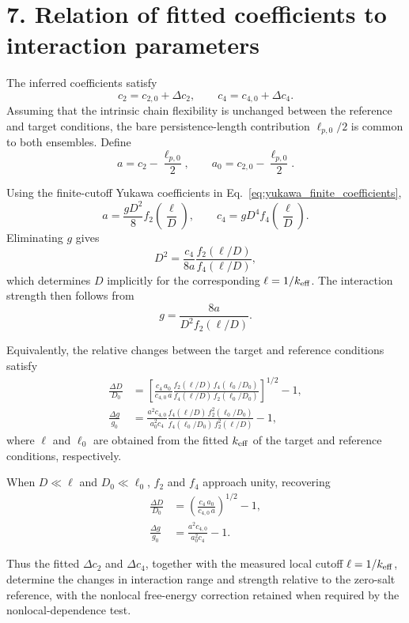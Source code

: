 \documentclass[11pt]{article}
\begin{document}
\section*{7. Relation of fitted coefficients to interaction parameters}

The inferred coefficients satisfy
\begin{equation}
c_2=c_{2,0}+\Delta c_2,
\qquad
c_4=c_{4,0}+\Delta c_4.
\end{equation}
Assuming that the intrinsic chain flexibility is unchanged between the reference and target conditions, the bare persistence-length contribution \(\ell_{p,0}/2\) is common to both ensembles. Define
\begin{equation}
a=c_2-\frac{\ell_{p,0}}{2},
\qquad
a_0=c_{2,0}-\frac{\ell_{p,0}}{2}.
\end{equation}

Using the finite-cutoff Yukawa coefficients in Eq.~\eqref{eq:yukawa_finite_coefficients},
\begin{equation}
a
=
\frac{gD^2}{8}
f_2\!\left(\frac{\ell}{D}\right),
\qquad
c_4
=
gD^4
f_4\!\left(\frac{\ell}{D}\right).
\end{equation}
Eliminating \(g\) gives
\begin{equation}
D^2
=
\frac{c_4}{8a}
\frac{
f_2\!\left(\ell/D\right)
}{
f_4\!\left(\ell/D\right)
},
\end{equation}
which determines \(D\) implicitly for the corresponding \(\ell=1/k_{\rm eff}\). The interaction strength then follows from
\begin{equation}
g
=
\frac{8a}{
D^2 f_2\!\left(\ell/D\right)
}.
\end{equation}

Equivalently, the relative changes between the target and reference conditions satisfy
\begin{align}
\frac{\Delta D}{D_0}
&=
\left[
\frac{c_4\,a_0}
{c_{4,0}\,a}
\frac{
f_2(\ell/D)\,
f_4(\ell_0/D_0)
}{
f_4(\ell/D)\,
f_2(\ell_0/D_0)
}
\right]^{1/2}
-1,
\\
\frac{\Delta g}{g_0}
&=
\frac{a^2c_{4,0}}
{a_0^2c_4}
\frac{
f_4(\ell/D)\,
f_2^2(\ell_0/D_0)
}{
f_4(\ell_0/D_0)\,
f_2^2(\ell/D)
}
-1,
\end{align}
where \(\ell\) and \(\ell_0\) are obtained from the fitted \(k_{\rm eff}\) of the target and reference conditions, respectively.

When \(D\ll\ell\) and \(D_0\ll\ell_0\), \(f_2\) and \(f_4\) approach unity, recovering
\begin{align}
\frac{\Delta D}{D_0}
&=
\left(
\frac{c_4\,a_0}
{c_{4,0}\,a}
\right)^{1/2}-1,
\\
\frac{\Delta g}{g_0}
&=
\frac{a^2c_{4,0}}
{a_0^2c_4}-1.
\end{align}

Thus the fitted \(\Delta c_2\) and \(\Delta c_4\), together with the measured local cutoff \(\ell=1/k_{\rm eff}\), determine the changes in interaction range and strength relative to the zero-salt reference, with the nonlocal free-energy correction retained when required by the nonlocal-dependence test.

% 
% 
\end{document}
